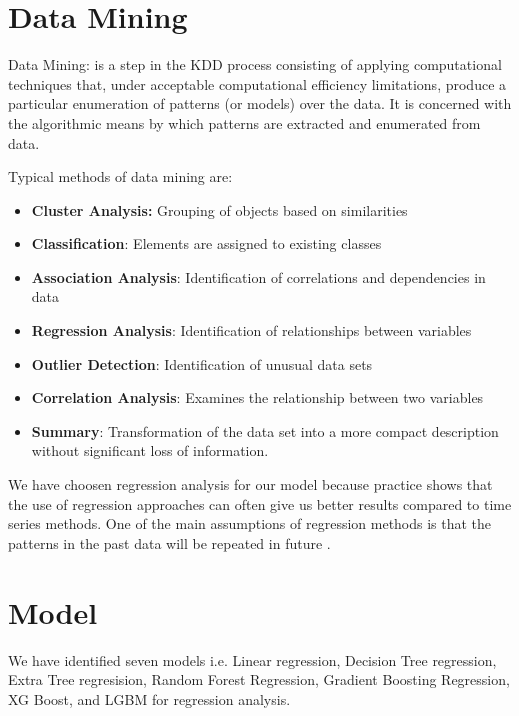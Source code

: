 \bigskip







	


\section{Data Mining}
Data Mining: is a step in the KDD process consisting of applying computational techniques that, under acceptable computational efficiency limitations, produce a particular enumeration of patterns (or models) over the data. It is concerned with the algorithmic means by which patterns are extracted and enumerated from data.

Typical methods of data mining are:

\begin{itemize}
	\item \textbf{Cluster Analysis:} Grouping of objects based on similarities
	\item \textbf{Classification}: Elements are assigned to existing classes
	\item \textbf{Association Analysis}: Identification of correlations and dependencies in data
	\item \textbf{Regression Analysis}: Identification of relationships between variables
	\item \textbf{Outlier Detection}: Identification of unusual data sets
	\item \textbf{Correlation Analysis}: Examines the relationship between two variables
	\item \textbf{Summary}: Transformation of the data set into a more compact description without significant 		loss of information.
\end{itemize}


We have choosen regression analysis for our model because practice shows that the use of regression approaches can often give us better results compared to time series methods. One of the main assumptions of regression methods is that the patterns in the past data will be repeated in future \cite{Pavlyshenko:2019}.



\section{Model}
We have identified seven models i.e. Linear regression, Decision Tree regression, Extra Tree regresision, Random Forest Regression, Gradient Boosting Regression, XG Boost, and \ac{LGBM} for regression analysis.

